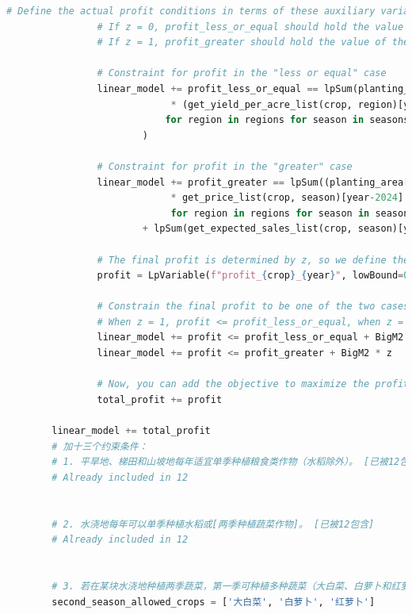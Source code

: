 \documentclass[withoutpreface]{cumcmthesis}
\begin{document}
\begin{appendices}
\begin{lstlisting}[language=python]
                # Define the actual profit conditions in terms of these auxiliary variables
                # If z = 0, profit_less_or_equal should hold the value of the first branch
                # If z = 1, profit_greater should hold the value of the second branch
    
                # Constraint for profit in the "less or equal" case
                linear_model += profit_less_or_equal == lpSum(planting_area[(crop, region, year, season)]
                             * (get_yield_per_acre_list(crop, region)[year-2024] * get_price_list(crop, season)[year-2024] * _risk - get_cost_list(crop, region)[year-2024])
                            for region in regions for season in seasons
                        )
    
                # Constraint for profit in the "greater" case
                linear_model += profit_greater == lpSum((planting_area[(crop, region, year, season)] * get_yield_per_acre_list(crop, region)[year-2024] - get_expected_sales_list(crop, season)[year-2024] - get_cost_list(crop, region)[year-2024])
                             * get_price_list(crop, season)[year-2024] * (1 - reduction_factor) 
                             for region in regions for season in seasons) \
                        + lpSum(get_expected_sales_list(crop, season)[year-2024] * get_price_list(crop, season)[year-2024] for season in seasons)
    
                # The final profit is determined by z, so we define the overall profit
                profit = LpVariable(f"profit_{crop}_{year}", lowBound=0)
    
                # Constrain the final profit to be one of the two cases
                # When z = 1, profit <= profit_less_or_equal, when z = 0, profit <= profit_greater
                linear_model += profit <= profit_less_or_equal + BigM2 * (1 - z)
                linear_model += profit <= profit_greater + BigM2 * z
    
                # Now, you can add the objective to maximize the profit
                total_profit += profit
    
        linear_model += total_profit
        # 加十三个约束条件：
        # 1. 平旱地、梯田和山坡地每年适宜单季种植粮食类作物（水稻除外）。 [已被12包含]
        # Already included in 12
    
    
        # 2. 水浇地每年可以单季种植水稻或[两季种植蔬菜作物]。 [已被12包含]
        # Already included in 12
    
    
        # 3. 若在某块水浇地种植两季蔬菜，第一季可种植多种蔬菜（大白菜、白萝卜和红萝卜除外）；第二季只能种植大白菜、白萝卜和红萝卜中的一种（便于管理）。
        second_season_allowed_crops = ['大白菜', '白萝卜', '红萝卜']
    

\end{lstlisting}
\end{appendices}
\end{document}
